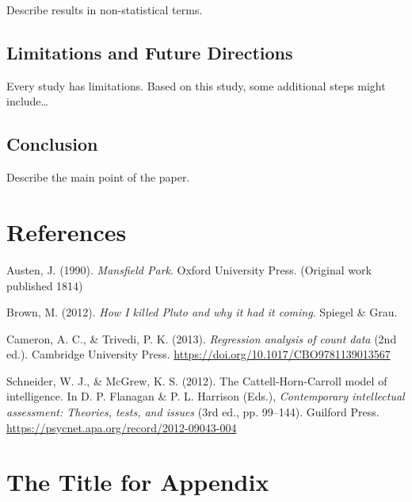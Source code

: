 \documentclass[
  jou,
  floatsintext,
  longtable,
  nolmodern,
  notxfonts,
  notimes,
  colorlinks=true,linkcolor=blue,citecolor=blue,urlcolor=blue]{apa7}
\newlength{\cslhangindent}
\newenvironment{CSLReferences}[2] %
 {\begin{list}{}{%
  \setlength{\itemindent}{0pt}
  \setlength{\leftmargin}{0pt}
  \setlength{\parsep}{0pt}
  \ifodd #1
   \setlength{\leftmargin}{\cslhangindent}
   \setlength{\itemindent}{-1\cslhangindent}
  \fi
  \setlength{\itemsep}{#2\baselineskip}}}
 {\end{list}}
\begin{document}
Describe results in non-statistical terms.

\subsection{Limitations and Future
Directions}\label{limitations-and-future-directions}

Every study has limitations. Based on this study, some additional steps
might include\ldots{}

\subsection{Conclusion}\label{conclusion}

Describe the main point of the paper.

\section{References}\label{references}

\label{refs}
\begin{CSLReferences}{1}{0}
Austen, J. (1990). \emph{Mansfield {P}ark}. Oxford University Press.
(Original work published 1814)

Brown, M. (2012). \emph{How {I} killed {Pluto} and why it had it
coming}. Spiegel \& Grau.

Cameron, A. C., \& Trivedi, P. K. (2013). \emph{Regression analysis of
count data} (2nd ed.). Cambridge University Press.
\url{https://doi.org/10.1017/CBO9781139013567}

Schneider, W. J., \& McGrew, K. S. (2012). The {Cattell-Horn-Carroll}
model of intelligence. In D. P. Flanagan \& P. L. Harrison (Eds.),
\emph{Contemporary intellectual assessment: {Theories}, tests, and
issues} (3rd ed., pp. 99--144). Guilford Press.
\url{https://psycnet.apa.org/record/2012-09043-004}

\end{CSLReferences}

\appendix

\section{The Title for Appendix}\label{the-title-for-appendix}
\end{document}
